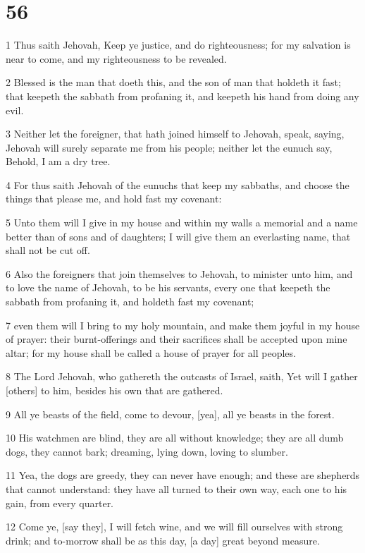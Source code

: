 \chapter{56}

\par 1 Thus saith Jehovah, Keep ye justice, and do righteousness; for my salvation is near to come, and my righteousness to be revealed.
\par 2 Blessed is the man that doeth this, and the son of man that holdeth it fast; that keepeth the sabbath from profaning it, and keepeth his hand from doing any evil.
\par 3 Neither let the foreigner, that hath joined himself to Jehovah, speak, saying, Jehovah will surely separate me from his people; neither let the eunuch say, Behold, I am a dry tree.
\par 4 For thus saith Jehovah of the eunuchs that keep my sabbaths, and choose the things that please me, and hold fast my covenant:
\par 5 Unto them will I give in my house and within my walls a memorial and a name better than of sons and of daughters; I will give them an everlasting name, that shall not be cut off.
\par 6 Also the foreigners that join themselves to Jehovah, to minister unto him, and to love the name of Jehovah, to be his servants, every one that keepeth the sabbath from profaning it, and holdeth fast my covenant;
\par 7 even them will I bring to my holy mountain, and make them joyful in my house of prayer: their burnt-offerings and their sacrifices shall be accepted upon mine altar; for my house shall be called a house of prayer for all peoples.
\par 8 The Lord Jehovah, who gathereth the outcasts of Israel, saith, Yet will I gather [others] to him, besides his own that are gathered.
\par 9 All ye beasts of the field, come to devour, [yea], all ye beasts in the forest.
\par 10 His watchmen are blind, they are all without knowledge; they are all dumb dogs, they cannot bark; dreaming, lying down, loving to slumber.
\par 11 Yea, the dogs are greedy, they can never have enough; and these are shepherds that cannot understand: they have all turned to their own way, each one to his gain, from every quarter.
\par 12 Come ye, [say they], I will fetch wine, and we will fill ourselves with strong drink; and to-morrow shall be as this day, [a day] great beyond measure.

